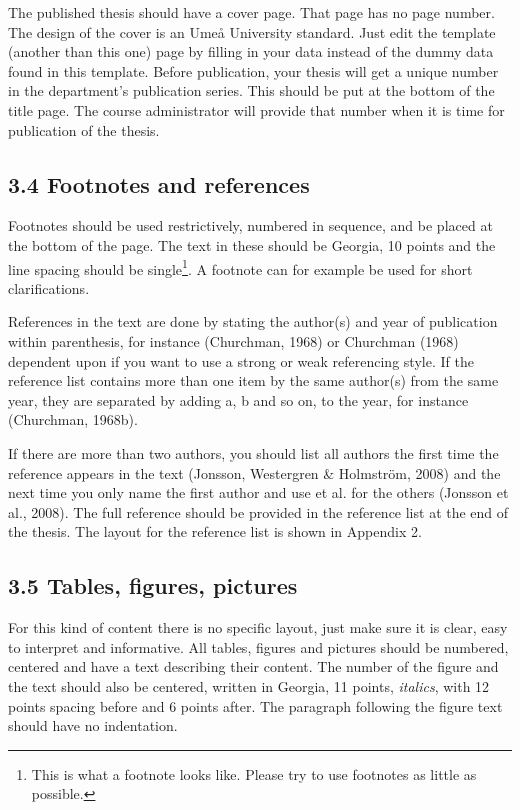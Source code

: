 \documentclass[]{article}
\begin{document}
The published thesis should have a cover page. That page has no page
number. The design of the cover is an Umeå University standard. Just
edit the template (another than this one) page by filling in your data
instead of the dummy data found in this template. Before publication,
your thesis will get a unique number in the department's publication
series. This should be put at the bottom of the title page. The course
administrator will provide that number when it is time for publication
of the thesis.

\subsection{3.4 Footnotes and references}

Footnotes should be used restrictively, numbered in sequence, and be
placed at the bottom of the page. The text in these should be Georgia,
10 points and the line spacing should be single\footnote{This is what a
  footnote looks like. Please try to use footnotes as little as
  possible.}. A footnote can for example be used for short
clarifications.

References in the text are done by stating the author(s) and year of
publication within parenthesis, for instance (Churchman, 1968) or
Churchman (1968) dependent upon if you want to use a strong or weak
referencing style. If the reference list contains more than one item by
the same author(s) from the same year, they are separated by adding a, b
and so on, to the year, for instance (Churchman, 1968b).

If there are more than two authors, you should list all authors the
first time the reference appears in the text (Jonsson, Westergren \&
Holmström, 2008) and the next time you only name the first author and
use et al. for the others (Jonsson et al., 2008). The full reference
should be provided in the reference list at the end of the thesis. The
layout for the reference list is shown in Appendix 2.

\subsection{3.5 Tables, figures, pictures}

For this kind of content there is no specific layout, just make sure it
is clear, easy to interpret and informative. All tables, figures and
pictures should be numbered, centered and have a text describing their
content. The number of the figure and the text should also be centered,
written in Georgia, 11 points, \emph{italics}, with 12 points spacing
before and 6 points after. The paragraph following the figure text
should have no indentation.
\end{document}
